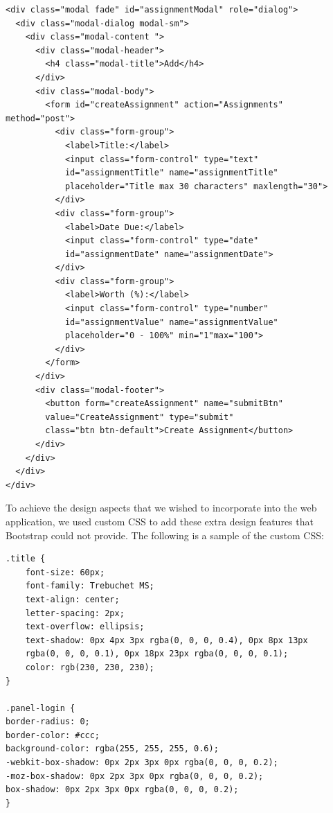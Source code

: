 \begin{verbatim}
<div class="modal fade" id="assignmentModal" role="dialog">
  <div class="modal-dialog modal-sm">
    <div class="modal-content ">
      <div class="modal-header">
        <h4 class="modal-title">Add</h4>
      </div>
      <div class="modal-body">
        <form id="createAssignment" action="Assignments" method="post">
          <div class="form-group">
            <label>Title:</label>
            <input class="form-control" type="text" 
            id="assignmentTitle" name="assignmentTitle" 
            placeholder="Title max 30 characters" maxlength="30">
          </div>
          <div class="form-group">
            <label>Date Due:</label>
            <input class="form-control" type="date" 
            id="assignmentDate" name="assignmentDate">
          </div>
          <div class="form-group">
            <label>Worth (%):</label>
            <input class="form-control" type="number" 
            id="assignmentValue" name="assignmentValue" 
            placeholder="0 - 100%" min="1"max="100">
          </div>
        </form>
      </div>
      <div class="modal-footer">
        <button form="createAssignment" name="submitBtn" 
        value="CreateAssignment" type="submit" 
        class="btn btn-default">Create Assignment</button>
      </div>
    </div>
  </div>
</div>
\end{verbatim}
To achieve the design aspects that we wished to incorporate into the web application, we used custom CSS to add these extra design features that Bootstrap could not provide. The following is a sample of the custom CSS:

\begin{verbatim}
.title {
    font-size: 60px;
    font-family: Trebuchet MS;
    text-align: center;
    letter-spacing: 2px;
    text-overflow: ellipsis;
    text-shadow: 0px 4px 3px rgba(0, 0, 0, 0.4), 0px 8px 13px
    rgba(0, 0, 0, 0.1), 0px 18px 23px rgba(0, 0, 0, 0.1);
    color: rgb(230, 230, 230);
}

.panel-login {
border-radius: 0;
border-color: #ccc;
background-color: rgba(255, 255, 255, 0.6);
-webkit-box-shadow: 0px 2px 3px 0px rgba(0, 0, 0, 0.2);
-moz-box-shadow: 0px 2px 3px 0px rgba(0, 0, 0, 0.2);
box-shadow: 0px 2px 3px 0px rgba(0, 0, 0, 0.2);
}
\end{verbatim}

